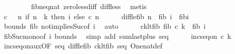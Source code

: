 \begin{isabellebody}
\ \ \ \ \ \ \isamarkupfalse%
\ {}\ fib{\isacharunderscore}{\kern0pt}neq{\isacharunderscore}{\kern0pt}{}{\isacharunderscore}{\kern0pt}nat\ zero{\isacharunderscore}{\kern0pt}less{\isacharunderscore}{\kern0pt}diff\ diff{\isacharunderscore}{\kern0pt}less\ \isamarkupfalse%
\ metis\isanewline
\ \ \ \ \isamarkupfalse%
\ {\isacharquery}{\kern0pt}c{\isacharprime}{\kern0pt}\ {\isacharequal}{\kern0pt}\ {\isachardoublequoteopen}{\isacharparenleft}{\kern0pt}{\isasymlambda}\ n{\isachardot}{\kern0pt}\ if\ n\ {\isacharequal}{\kern0pt}\ k{\isacharplus}{\kern0pt}{}\ then\ i\ else\ c\ n{\isacharparenright}{\kern0pt}{\isachardoublequoteclose}\isanewline
\ \ \ \ \isamarkupfalse%
\ diff{\isacharunderscore}{\kern0pt}le{\isacharunderscore}{\kern0pt}fib{\isacharcolon}{\kern0pt}\ {\isachardoublequoteopen}n\ {\isacharminus}{\kern0pt}\ fib\ i\ {\isacharless}{\kern0pt}\ fib{\isacharparenleft}{\kern0pt}i{\isacharminus}{\kern0pt}{}{\isacharparenright}{\kern0pt}{\isachardoublequoteclose}\isanewline
\ \ \ \ \ \ \isamarkupfalse%
\ bounds\ fib{}\ not{}{\isacharunderscore}{\kern0pt}implies{\isacharunderscore}{\kern0pt}Suc{\isacharbrackleft}{\kern0pt}of\ i{\isacharbrackright}{\kern0pt}\ \isamarkupfalse%
\ auto\isanewline
\ \ \ \ \isamarkupfalse%
\ ck{\isacharunderscore}{\kern0pt}lt{\isacharunderscore}{\kern0pt}fib{\isacharcolon}{\kern0pt}\ {\isachardoublequoteopen}fib\ {\isacharparenleft}{\kern0pt}c\ k{\isacharparenright}{\kern0pt}\ {\isacharless}{\kern0pt}\ fib\ i{\isachardoublequoteclose}\ \isanewline
\ \ \ \ \ \ \isamarkupfalse%
\ fib{\isacharunderscore}{\kern0pt}Suc{\isacharunderscore}{\kern0pt}mono{\isacharbrackleft}{\kern0pt}of\ {\isachardoublequoteopen}i{\isacharminus}{\kern0pt}{}{\isachardoublequoteclose}{\isacharbrackright}{\kern0pt}\ bounds\ \isamarkupfalse%
\ {\isacharparenleft}{\kern0pt}simp\ add{\isacharcolon}{\kern0pt}\ sum{\isachardot}{\kern0pt}last{\isacharunderscore}{\kern0pt}plus\ seq{\isacharparenright}{\kern0pt}\isanewline
\ \ \ \ \isamarkupfalse%
\ {\isachardoublequoteopen}inc{\isacharunderscore}{\kern0pt}seq{\isacharunderscore}{\kern0pt}on\ {\isacharquery}{\kern0pt}c{\isacharprime}{\kern0pt}\ {\isacharbraceleft}{\kern0pt}{}{\isachardot}{\kern0pt}{\isachardot}{\kern0pt}k{\isacharbraceright}{\kern0pt}{\isachardoublequoteclose}\isanewline
\ \ \ \ \ \ \isamarkupfalse%
\ inc{\isacharunderscore}{\kern0pt}seq{\isacharunderscore}{\kern0pt}on{\isacharunderscore}{\kern0pt}aux{\isacharbrackleft}{\kern0pt}OF\ seq{\isacharparenleft}{\kern0pt}{}{\isacharparenright}{\kern0pt}\ diff{\isacharunderscore}{\kern0pt}le{\isacharunderscore}{\kern0pt}fib\ ck{\isacharunderscore}{\kern0pt}lt{\isacharunderscore}{\kern0pt}fib\ seq{\isacharparenleft}{\kern0pt}{}{\isacharparenright}{\kern0pt}{\isacharbrackright}{\kern0pt}\ One{\isacharunderscore}{\kern0pt}nat{\isacharunderscore}{\kern0pt}def\ \isanewline

\end{isabellebody}
